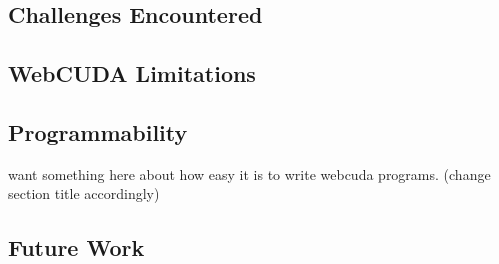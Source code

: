 
\subsection{Challenges Encountered}
\subsection{WebCUDA Limitations}
\subsection{Programmability}
want something here about how easy it is to write webcuda programs. (change section title accordingly)
\subsection{Future Work}
